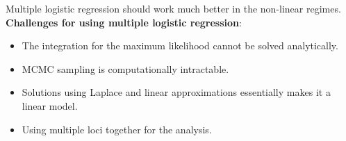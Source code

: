 \documentclass[a0paper,portrait,debug]{baposter}
\makeatletter
\newcommand{\specialcell}[2][c]{%
  \begin{tabular}[#1]{@{}c@{}}#2\end{tabular}}
\makeatother
\begin{document}
\begin{poster}
{\begin{multicols}{2}
  Multiple logistic regression should work much better in the non-linear regimes.\\
  {\textbf{Challenges for using multiple logistic regression}:}
  \begin{itemize}
    \item The integration for the maximum likelihood cannot be solved analytically.
    \item MCMC sampling is computationally intractable.
    \item Solutions using Laplace and linear approximations essentially makes it a linear model.
    \item Using multiple loci together for the analysis.
  \end{itemize} 
  \,\\[1.5em]
\end{multicols}




}
\end{poster}
\end{document}
